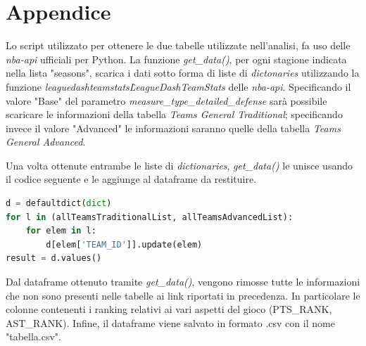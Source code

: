 \documentclass[11pt,a4paper]{article}
\begin{document}
\newpage
\appendix
\section{Appendice}
 Lo script utilizzato per ottenere le due tabelle utilizzate nell'analisi, fa uso delle \emph{nba-api} ufficiali per Python.
 La funzione \emph{get\_data()}, per ogni stagione indicata nella lista "seasons", scarica i dati sotto forma di liste di \emph{dictonaries} utilizzando la funzione \emph{leaguedashteamstats\.LeagueDashTeamStats} delle \emph{nba-api}. Specificando il valore "Base" del parametro \emph{measure\_type\_detailed\_defense} sarà possibile scaricare le informazioni della tabella \emph{Teams General Traditional}; specificando invece il valore "Advanced" le informazioni saranno quelle della tabella \emph{Teams General Advanced}.
 
 Una volta ottenute entrambe le liste di \emph{dictionaries}, \emph{get\_data()} le unisce usando il codice seguente e le aggiunge al dataframe da restituire.

\vspace{0.5cm} 
\begin{lstlisting}[language=python,tabsize=1,frame = single]
d = defaultdict(dict)
for l in (allTeamsTraditionalList, allTeamsAdvancedList):
    for elem in l:
        d[elem['TEAM_ID']].update(elem)
result = d.values()
\end{lstlisting}
\vspace{0.5cm}
 
Dal dataframe ottenuto tramite \emph{get\_data()}, vengono rimosse tutte le informazioni che non sono presenti nelle tabelle ai link riportati in precedenza. In particolare le colonne contenenti i ranking relativi ai vari aspetti del gioco (PTS\_RANK, AST\_RANK). Infine, il dataframe viene salvato in formato .csv con il nome "tabella.csv".
\end{document}
